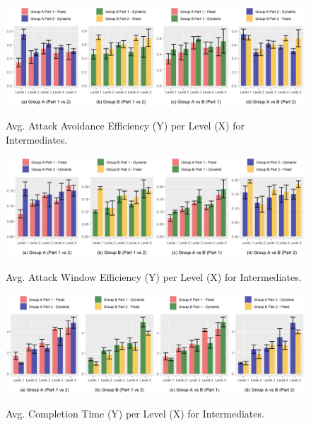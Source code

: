\begin{figure}[!ht]
    \begin{center}
    \caption{Avg. Attack Avoidance Efficiency (Y) per Level (X) for Intermediates.}
        \includegraphics[width=34em]{figures/attack_avoidance_efficiency-intermediate_players.png}
        \label{fig:result-metric-intermediates-attack-avoidance-efficiency}
    \end{center}
\end{figure}

\begin{figure}[!ht]
    \begin{center}
    \caption{Avg. Attack Window Efficiency (Y) per Level (X) for Intermediates.}
        \includegraphics[width=34em]{figures/attack_window_efficiency-intermediate_players.png}
        \label{fig:result-metric-intermediates-attack-window-efficiency}
    \end{center}
\end{figure}

\begin{figure}[!ht]
    \begin{center}
    \caption{Avg. Completion Time (Y) per Level (X) for Intermediates.}
        \includegraphics[width=34em]{figures/completion_time-intermediate_players.png}
        \label{fig:result-metric-intermediates-completion-time}
    \end{center}
\end{figure}


